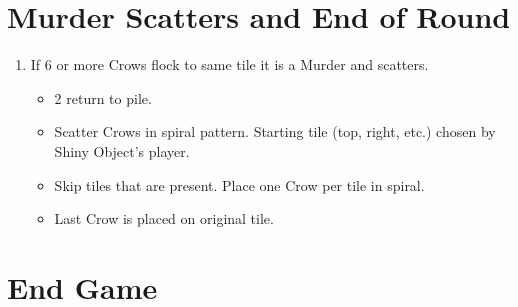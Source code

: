 \documentclass[12pt]{article}
\newenvironment{enumerateCustom}
{\begin{enumerate}
  \setlength{\itemsep}{1pt}
  \setlength{\parskip}{0pt}
  \setlength{\parsep}{0pt}}
{\end{enumerate}}
\newenvironment{itemizeCustom}
{\begin{itemize}
  \setlength{\itemsep}{1pt}
  \setlength{\parskip}{0pt}
  \setlength{\parsep}{0pt}}
{\end{itemize}}
\begin{document}
\begin{mdframed}[style = customFrame]
\begin{multicols*}{2}
\section*{Murder Scatters and End of Round}
\begin{enumerateCustom}
	\item If 6 or more Crows flock to same tile it is a Murder and scatters.
		\begin{itemizeCustom}
			\item 2 return to pile.
			\item Scatter Crows in spiral pattern. Starting tile (top, right, etc.) chosen by Shiny Object's player.
			\item Skip tiles that are present. Place one Crow per tile in spiral.
			\item Last Crow is placed on original tile.
		\end{itemizeCustom}
\end{enumerateCustom}

\section*{End Game}

\end{multicols*}
\end{mdframed}
\end{document}
